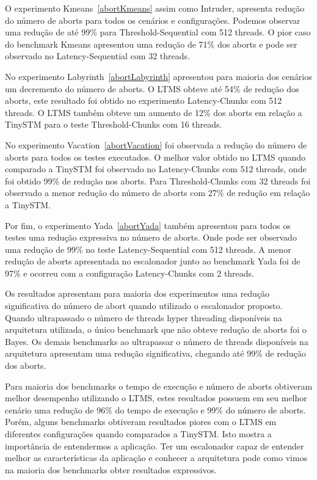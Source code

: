 \documentclass[diss,capa]{texufpel}
\begin{document}
O experimento Kmeans~\ref{abortKmeans} assim como Intruder, apresenta redução do número de aborts para todos os cenários e configurações. Podemos observar uma redução de até 99\% para Threshold-Sequential com 512 threads. O pior caso do benchmark Kmeans apresentou uma redução de 71\% dos aborts e pode ser observado no Latency-Sequential com 32 threads.



No experimento Labyrinth~\ref{abortLabyrinth} apresentou para maioria dos cenários um decremento do número de aborts. O LTMS obteve até 54\% de redução dos aborts, este resultado foi obtido no experimento Latency-Chunks com 512 threads. O LTMS também obteve um aumento de 12\% dos aborts em relação a TinySTM para o teste Threshold-Chunks com 16 threads.

No experimento Vacation~\ref{abortVacation} foi observada a redução do número de aborts para todos os testes executados. O melhor valor obtido no LTMS quando comparado a TinySTM foi observado no Latency-Chunks com 512 threads, onde foi obtido 99\% de redução nos aborts. Para Threshold-Chunks com 32 threads foi observado a menor redução do número de aborts com 27\% de redução em relação a TinySTM.

Por fim, o experimento Yada~\ref{abortYada} também apresentou para todos os testes uma redução expressiva no número de aborts. Onde pode ser observado uma redução de 99\% no teste Latency-Sequential com 512 threads. A menor redução de aborts apresentada no escalonador junto ao benchmark Yada foi de 97\% e ocorreu com a configuração Latency-Chunks com 2 threads.

Os resultados apresentam para maioria dos experimentos uma redução significativa do número de abort quando utilizado o escalonador proposto. Quando ultrapassado o número de threads hyper threading disponíveis na arquitetura utilizada, o único benchmark que não obteve redução de aborts foi o Bayes. Os demais benchmarks ao ultrapassar o número de threads disponíveis na arquitetura apresentam uma redução significativa, chegando até 99\% de redução dos aborts.



Para maioria dos benchmarks o tempo de execução e número de aborts obtiveram melhor desempenho utilizando o LTMS, estes resultados possuem em seu melhor cenário uma redução de 96\% do tempo de execução e 99\% do número de aborts. Porém, alguns benchmarks obtiveram resultados piores com o LTMS em diferentes configurações quando comparados a TinySTM. Isto mostra a importância de entendermos a aplicação. Ter um escalonador capaz de entender melhor as características da aplicação e conhecer a arquitetura pode como vimos na maioria dos benchmarks obter resultados expressivos.
\end{document}
